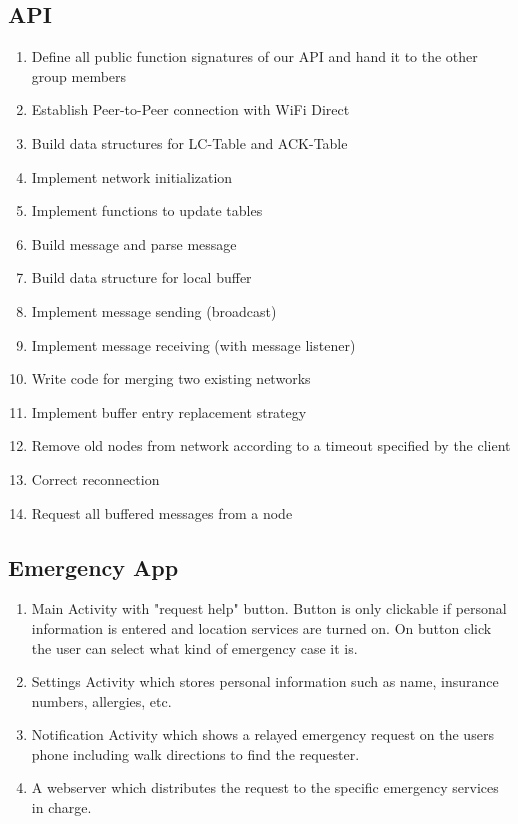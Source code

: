 	
\subsection{API}


\begin{enumerate}

\item Define all public function signatures of our API and hand it to the other group members
\item Establish Peer-to-Peer connection with WiFi Direct
\item Build data structures for LC-Table and ACK-Table
\item Implement network initialization
\item Implement functions to update tables
\item Build message and parse message
\item Build data structure for local buffer
\item Implement message sending (broadcast)
\item Implement message receiving (with message listener)
\item Write code for merging two existing networks
\item Implement buffer entry replacement strategy
\item Remove old nodes from network according to a timeout specified by the client
\item Correct reconnection
\item Request all buffered messages from a node
\end{enumerate}
		
\subsection{Emergency App}
	\begin{enumerate}
		\item Main Activity with "request help" button. Button is only clickable if personal information is entered and location services are turned on. On button click the user can select what kind of emergency case it is.
		\item Settings Activity which stores personal information such as name, insurance numbers, allergies, etc.
		\item Notification Activity which shows a relayed emergency request on the users phone including walk directions to find the requester.
		\item A webserver which distributes the request to the specific emergency services in charge.
	\end{enumerate}
		
